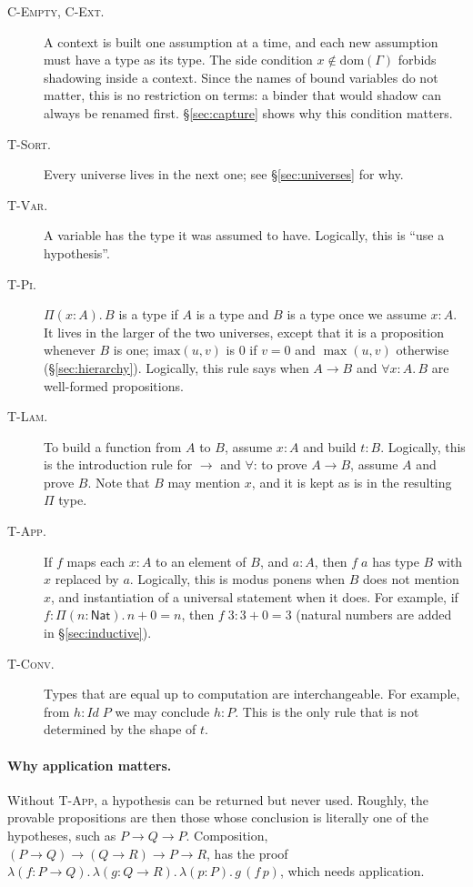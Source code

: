 \documentclass[acmsmall,screen,nonacm]{acmart}
\newcommand{\tPi}[3]{\Pi(#1{:}#2).\,#3}
\newcommand{\tLam}[3]{\lambda(#1{:}#2).\,#3}
\newcommand{\dom}{\mathrm{dom}}
\newcommand{\imax}{\mathrm{imax}}
\begin{document}
\begin{description}
  \item[\textsc{C-Empty}, \textsc{C-Ext}.]
    A context is built one assumption at a time, and each new assumption must have a type as its type.
    The side condition $x \notin \dom(\Gamma)$ forbids shadowing inside a context.
    Since the names of bound variables do not matter, this is no restriction on terms: a binder that would shadow can always be renamed first.
    \S\ref{sec:capture} shows why this condition matters.
  \item[\textsc{T-Sort}.]
    Every universe lives in the next one; see \S\ref{sec:universes} for why.
  \item[\textsc{T-Var}.]
    A variable has the type it was assumed to have. Logically, this is ``use a hypothesis''.
  \item[\textsc{T-Pi}.]
    $\tPi{x}{A}{B}$ is a type if $A$ is a type and $B$ is a type once we assume $x : A$.
    It lives in the larger of the two universes, except that it is a proposition whenever $B$ is one;
    $\imax(u, v)$ is $0$ if $v = 0$ and $\max(u, v)$ otherwise (\S\ref{sec:hierarchy}).
    Logically, this rule says when $A \to B$ and $\forall x{:}A.\,B$ are well-formed propositions.
  \item[\textsc{T-Lam}.]
    To build a function from $A$ to $B$, assume $x : A$ and build $t : B$.
    Logically, this is the introduction rule for $\to$ and $\forall$: to prove $A \to B$, assume $A$ and prove $B$.
    Note that $B$ may mention $x$, and it is kept as is in the resulting $\Pi$ type.
  \item[\textsc{T-App}.]
    If $f$ maps each $x : A$ to an element of $B$, and $a : A$, then $f\;a$ has type $B$ with $x$ replaced by $a$.
    Logically, this is modus ponens when $B$ does not mention $x$, and instantiation of a universal statement when it does.
    For example, if $f : \tPi{n}{\mathsf{Nat}}{n + 0 = n}$, then $f\;3 : 3 + 0 = 3$ (natural numbers are added in \S\ref{sec:inductive}).
  \item[\textsc{T-Conv}.]
    Types that are equal up to computation are interchangeable.
    For example, from $h : \mathit{Id}\;P$ we may conclude $h : P$.
    This is the only rule that is not determined by the shape of $t$.
\end{description}

\paragraph{Why application matters.}
Without \textsc{T-App}, a hypothesis can be returned but never used.
Roughly, the provable propositions are then those whose conclusion is literally one of the hypotheses, such as $P \to Q \to P$.
Composition, $(P \to Q) \to (Q \to R) \to P \to R$, has the proof
$\tLam{f}{P \to Q}{\tLam{g}{Q \to R}{\tLam{p}{P}{g\,(f\,p)}}}$, which needs application.
\end{document}
